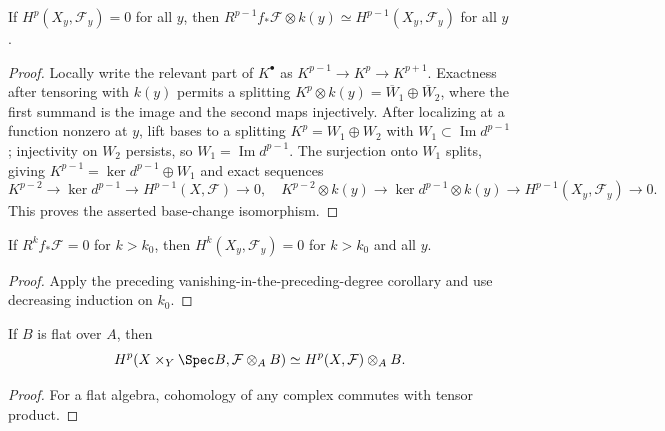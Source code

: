 \begin{corollary}
\label{mumford-source-base-change-vanishing}
If $H^p(X_y,\mathcal F_y)=0$ for all $y$, then
$R^{p-1}f_*\mathcal F\otimes k(y)\simeq H^{p-1}(X_y,\mathcal F_y)$ for all $y$.
\end{corollary}
\begin{proof}
Locally write the relevant part of $K^\bullet$ as
$K^{p-1}\to K^p\to K^{p+1}$. Exactness after tensoring with $k(y)$ permits
a splitting $K^p\otimes k(y)=\overline W_1\oplus\overline W_2$, where the
first summand is the image and the second maps injectively. After localizing
at a function nonzero at $y$, lift bases to a splitting $K^p=W_1\oplus W_2$
with $W_1\subset\operatorname{Im}d^{p-1}$; injectivity on $W_2$ persists,
so $W_1=\operatorname{Im}d^{p-1}$. The surjection onto $W_1$ splits, giving
$K^{p-1}=\ker d^{p-1}\oplus W_1$ and exact sequences
\[
 K^{p-2}\to\ker d^{p-1}\to H^{p-1}(X,\mathcal F)\to0,
\quad
 K^{p-2}\otimes k(y)\to\ker d^{p-1}\otimes k(y)\to
 H^{p-1}(X_y,\mathcal F_y)\to0.
\]
This proves the asserted base-change isomorphism.
\end{proof}

\begin{corollary}
\label{mumford-source-higher-vanishing}
If $R^kf_*\mathcal F=0$ for $k>k_0$, then $H^k(X_y,\mathcal F_y)=0$ for
$k>k_0$ and all $y$.
\end{corollary}
\begin{proof}
Apply the preceding vanishing-in-the-preceding-degree corollary and use
decreasing induction on $k_0$.
\end{proof}

\begin{corollary}
\label{mumford-cor-flat-base-change}
If $B$ is flat over $A$, then
\[
 H^p(X\times_Y\Spec B,\mathcal F\otimes_A B)\simeq H^p(X,\mathcal F)\otimes_A B.
\]
\end{corollary}
\begin{proof}
For a flat algebra, cohomology of any complex commutes with tensor product.
\end{proof}

